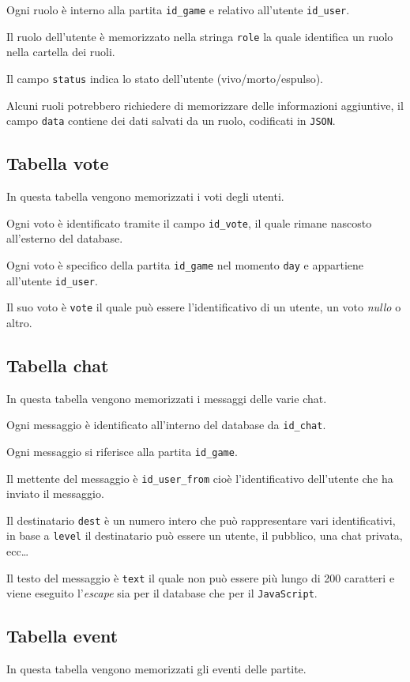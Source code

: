 \documentclass[10pt,a4paper]{article}
\newcommand{\lang}[1]{\texttt{#1}}
\begin{document}
Ogni ruolo è interno alla partita \texttt{id\_game} e relativo all'utente \texttt{id\_user}. 

Il ruolo dell'utente è memorizzato nella stringa \texttt{role} la quale identifica un ruolo nella cartella dei ruoli. 

Il campo \texttt{status} indica lo stato dell'utente (vivo/morto/espulso).

Alcuni ruoli potrebbero richiedere di memorizzare delle informazioni aggiuntive, il campo \texttt{data} contiene dei dati salvati da un ruolo, codificati in \texttt{JSON}.

\subsection{Tabella vote}
In questa tabella vengono memorizzati i voti degli utenti. 

Ogni voto è identificato tramite il campo \texttt{id\_vote}, il quale rimane nascosto all'esterno del database. 

Ogni voto è specifico della partita \texttt{id\_game} nel momento \texttt{day} e appartiene all'utente \texttt{id\_user}. 

Il suo voto è \texttt{vote} il quale può essere l'identificativo di un utente, un voto \emph{nullo} o altro. 

\subsection{Tabella chat}
In questa tabella vengono memorizzati i messaggi delle varie chat. 

Ogni messaggio è identificato all'interno del database da \texttt{id\_chat}. 

Ogni messaggio si riferisce alla partita \texttt{id\_game}. 

Il mettente del messaggio è \texttt{id\_user\_from} cioè l'identificativo dell'utente che ha inviato il messaggio. 

Il destinatario \texttt{dest} è un numero intero che può rappresentare vari identificativi, in base a \texttt{level} il destinatario può essere un utente, il pubblico, una chat privata, ecc\dots

Il testo del messaggio è \texttt{text} il quale non può essere più lungo di 200 caratteri e viene eseguito l'\emph{escape} sia per il database che per il \lang{JavaScript}.

\subsection{Tabella event}
In questa tabella vengono memorizzati gli eventi delle partite. 
\end{document}
